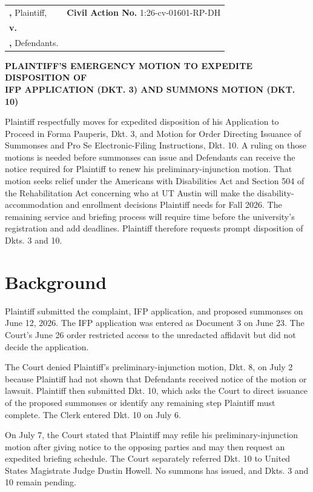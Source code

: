 \documentclass[12pt]{article}
\makeatletter
\renewcommand{\FilingCivilActionNumber}{1:26-cv-01601-RP-DH}
\newcommand{\Caption}{%
  \begin{singlespace}
  \begin{center}
  \textbf{\FilingCourtName}\\
  \textbf{\FilingDistrictName}\\
  \textbf{\FilingDivisionName}
  \end{center}

  \vspace{0.45em}

  \noindent
  \begin{tabularx}{\textwidth}{@{}>{\raggedright\arraybackslash}X>{\raggedright\arraybackslash}p{2.95in}@{}}
  \textbf{\FilingPlaintiffNameUpper,} Plaintiff, & \textbf{Civil Action No.} \FilingCivilActionNumber \\
  \textbf{v.} & \\
  \textbf{\FilingDefendantsInlineUpper,} Defendants. & \\
  \end{tabularx}

  \vspace{1.0em}
  \end{singlespace}%
}
\makeatother
\begin{document}
\Caption

\begin{singlespace}
\begin{center}
\textbf{PLAINTIFF'S EMERGENCY MOTION TO EXPEDITE DISPOSITION OF}\\
\textbf{IFP APPLICATION (DKT. 3) AND SUMMONS MOTION (DKT. 10)}
\end{center}
\end{singlespace}

Plaintiff \FilingPlaintiffName{} respectfully moves for expedited disposition of his Application to Proceed in Forma Pauperis, Dkt. 3, and Motion for Order Directing Issuance of Summonses and Pro Se Electronic-Filing Instructions, Dkt. 10. A ruling on those motions is needed before summonses can issue and Defendants can receive the notice required for Plaintiff to renew his preliminary-injunction motion. That motion seeks relief under the Americans with Disabilities Act and Section 504 of the Rehabilitation Act concerning who at UT Austin will make the disability-accommodation and enrollment decisions Plaintiff needs for Fall 2026. The remaining service and briefing process will require time before the university's registration and add deadlines. Plaintiff therefore requests prompt disposition of Dkts. 3 and 10.

\section*{Background}

Plaintiff submitted the complaint, IFP application, and proposed summonses on June 12, 2026. The IFP application was entered as Document 3 on June 23. The Court's June 26 order restricted access to the unredacted affidavit but did not decide the application.

The Court denied Plaintiff's preliminary-injunction motion, Dkt. 8, on July 2 because Plaintiff had not shown that Defendants received notice of the motion or lawsuit. Plaintiff then submitted Dkt. 10, which asks the Court to direct issuance of the proposed summonses or identify any remaining step Plaintiff must complete. The Clerk entered Dkt. 10 on July 6.

On July 7, the Court stated that Plaintiff may refile his preliminary-injunction motion after giving notice to the opposing parties and may then request an expedited briefing schedule. The Court separately referred Dkt. 10 to United States Magistrate Judge Dustin Howell. No summons has issued, and Dkts. 3 and 10 remain pending.
\end{document}
